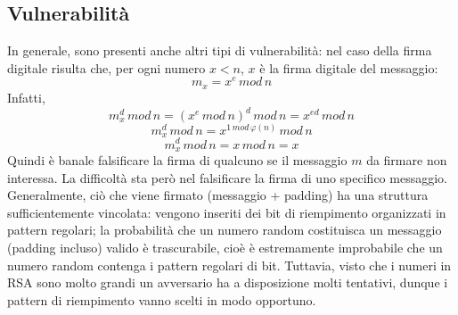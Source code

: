 \subsection{Vulnerabilità}
In generale, sono presenti anche altri tipi di vulnerabilità: nel caso della firma digitale risulta che, per ogni numero $x < n$, $x$ è la firma digitale del messaggio:
\newline
\begin{equation}
m_{x} = x^e \,  mod \, n
\end{equation}
\newline 
Infatti, 
\newline
\begin{equation}
m_{x}^d \, mod \, n = (x^e \, mod \, n)^d \, mod \, n = x^{ed} \, mod \, n
\end{equation}
\newline 
\begin{equation}
m_{x}^d \, mod \, n = x^{1 \, mod \, \varphi(n)} \, mod \, n
\end{equation}
\newline
\begin{equation}
m_{x}^d \, mod \, n = x \, mod \, n = x
\end{equation}
\newline 
Quindi è banale falsificare la firma di qualcuno se il messaggio $m$ da firmare non interessa. La difficoltà sta però nel falsificare la firma di uno specifico messaggio. 
\newline
Generalmente, ciò che viene firmato (messaggio + padding) ha una struttura sufficientemente vincolata: vengono inseriti dei bit di riempimento organizzati in pattern regolari; la probabilità che un numero random costituisca un messaggio (padding incluso) valido è trascurabile, cioè è estremamente improbabile che un numero random contenga i pattern regolari di bit. Tuttavia, visto che i numeri in RSA sono molto grandi un avversario ha a disposizione molti tentativi, dunque i pattern di riempimento vanno scelti in modo opportuno.

